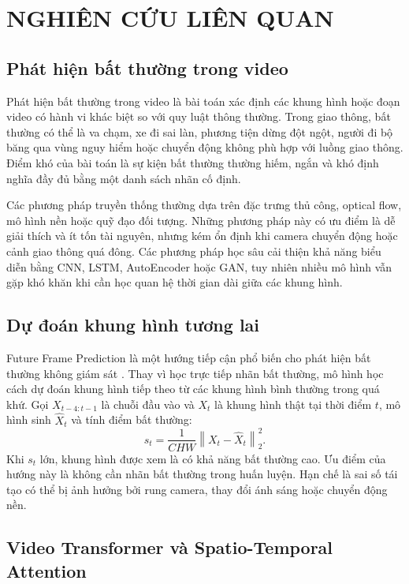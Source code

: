 \section{NGHIÊN CỨU LIÊN QUAN}

\subsection{Phát hiện bất thường trong video}

Phát hiện bất thường trong video là bài toán xác định các khung hình hoặc đoạn video có hành vi khác biệt so với quy luật thông thường. Trong giao thông, bất thường có thể là va chạm, xe đi sai làn, phương tiện dừng đột ngột, người đi bộ băng qua vùng nguy hiểm hoặc chuyển động không phù hợp với luồng giao thông. Điểm khó của bài toán là sự kiện bất thường thường hiếm, ngắn và khó định nghĩa đầy đủ bằng một danh sách nhãn cố định.

Các phương pháp truyền thống thường dựa trên đặc trưng thủ công, optical flow, mô hình nền hoặc quỹ đạo đối tượng. Những phương pháp này có ưu điểm là dễ giải thích và ít tốn tài nguyên, nhưng kém ổn định khi camera chuyển động hoặc cảnh giao thông quá đông. Các phương pháp học sâu cải thiện khả năng biểu diễn bằng CNN, LSTM, AutoEncoder hoặc GAN, tuy nhiên nhiều mô hình vẫn gặp khó khăn khi cần học quan hệ thời gian dài giữa các khung hình.

\subsection{Dự đoán khung hình tương lai}

Future Frame Prediction là một hướng tiếp cận phổ biến cho phát hiện bất thường không giám sát \cite{c10}. Thay vì học trực tiếp nhãn bất thường, mô hình học cách dự đoán khung hình tiếp theo từ các khung hình bình thường trong quá khứ. Gọi $X_{t-4:t-1}$ là chuỗi đầu vào và $X_t$ là khung hình thật tại thời điểm $t$, mô hình sinh $\hat{X}_t$ và tính điểm bất thường:
\begin{equation}
s_t = \frac{1}{CHW}\left\|X_t - \hat{X}_t\right\|_2^2.
\end{equation}
Khi $s_t$ lớn, khung hình được xem là có khả năng bất thường cao. Ưu điểm của hướng này là không cần nhãn bất thường trong huấn luyện. Hạn chế là sai số tái tạo có thể bị ảnh hưởng bởi rung camera, thay đổi ánh sáng hoặc chuyển động nền.

\subsection{Video Transformer và Spatio-Temporal Attention}

